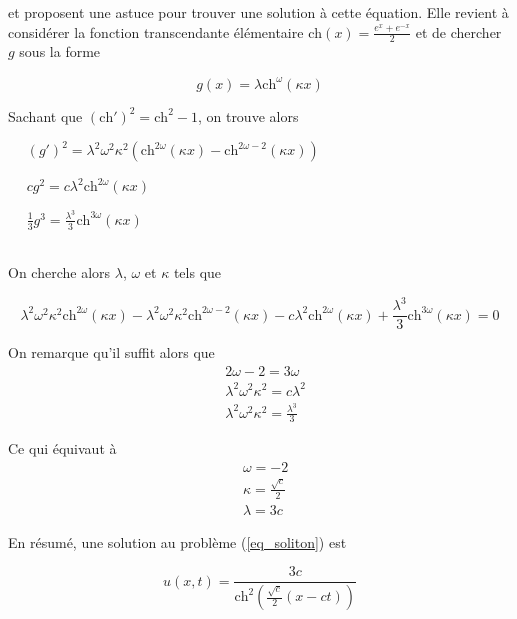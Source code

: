 \documentclass[12pt,a4paper]{article}
\numberwithin{equation}{section}
\begin{document}
\cite{Garnier} et \cite{MT} proposent une astuce pour trouver une solution à cette équation. Elle revient à considérer la fonction transcendante élémentaire $\text{ch}(x) = \frac{e^x+ e^{-x}}{2}$ et de chercher $g$ sous la forme 

\begin{equation*}
     g(x) = \lambda\text{ch}^{\omega}(\kappa x)
\end{equation*}

Sachant que $(\text{ch}')^2 = \text{ch}^2 - 1$, on trouve alors
\begin{list}{}{}
    \item[\textbullet]~~ $(g')^2 = \lambda^2\omega^2\kappa^2\left( \text{ch}^{2\omega}(\kappa x) - \text{ch}^{2\omega-2}(\kappa x)\right)$
    \item[\textbullet]~~ $cg^2 = c \lambda^2\text{ch}^{2\omega}(\kappa x)$
    \item[\textbullet]~~ $\frac{1}{3}g^3 = \frac{\lambda^3}{3}\text{ch}^{3\omega}(\kappa x)$
    
\end{list}\,\\

On cherche alors $\lambda$, $\omega$ et $\kappa$ tels que

\begin{equation*}
    \lambda^2\omega^2\kappa^2 \text{ch}^{2\omega}(\kappa x) - \lambda^2\omega^2\kappa^2 \text{ch}^{2\omega-2}(\kappa x) - c \lambda^2\text{ch}^{2\omega}(\kappa x) + \frac{\lambda^3}{3}\text{ch}^{3\omega}(\kappa x) = 0
\end{equation*}

On remarque qu'il suffit alors que 
\begin{align*}
    & 2\omega - 2 = 3\omega\\
    &\lambda^2\omega^2\kappa^2= c\lambda^2 \\ 
    & \lambda^2\omega^2\kappa^2 = \frac{\lambda^3}{3}
\end{align*}

Ce qui équivaut à
\begin{align*}
    &\omega = -2\\
    &\kappa = \frac{\sqrt{c}}{2}\\
    &\lambda = 3c
\end{align*}

En résumé, une solution au problème (\ref{eq_soliton}) est

\begin{equation}
    u(x,t) = \frac{3c}{\text{ch}^2\left( \frac{\sqrt{c}}{2}(x-ct)\right)}
\end{equation}
\end{document}
